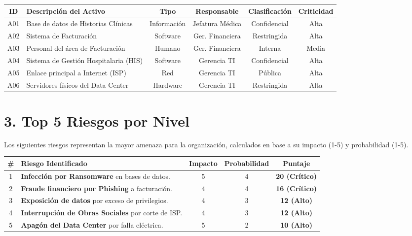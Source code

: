 \documentclass[11pt,a4paper]{article}
\begin{document}
\vspace{0.3cm}
\noindent
\begin{tabularx}{\textwidth}{|c|X|c|c|c|c|}
\hline
\rowcolor{primary} \textbf{\color{white}ID} & \textbf{\color{white}Descripción del Activo} & \textbf{\color{white}Tipo} & \textbf{\color{white}Responsable} & \textbf{\color{white}Clasificación} & \textbf{\color{white}Criticidad} \\ \hline
A01 & Base de datos de Historias Clínicas & Información & Jefatura Médica & Confidencial & Alta \\ \hline
A02 & Sistema de Facturación & Software & Ger. Financiera & Restringida & Alta \\ \hline
A03 & Personal del área de Facturación & Humano & Ger. Financiera & Interna & Media \\ \hline
A04 & Sistema de Gestión Hospitalaria (HIS) & Software & Gerencia TI & Confidencial & Alta \\ \hline
A05 & Enlace principal a Internet (ISP) & Red & Gerencia TI & Pública & Alta \\ \hline
A06 & Servidores físicos del Data Center & Hardware & Gerencia TI & Restringida & Alta \\ \hline
\end{tabularx}

\vspace{0.8cm}

\section*{3. Top 5 Riesgos por Nivel}
Los siguientes riesgos representan la mayor amenaza para la organización, calculados en base a su impacto (1-5) y probabilidad (1-5).

\vspace{0.3cm}
\noindent
\begin{tabularx}{\textwidth}{|c|X|c|c|c|}
\hline
\rowcolor{primary} \textbf{\color{white}\#} & \textbf{\color{white}Riesgo Identificado} & \textbf{\color{white}Impacto} & \textbf{\color{white}Probabilidad} & \textbf{\color{white}Puntaje} \\ \hline
1 & \textbf{Infección por Ransomware} en bases de datos. & 5 & 4 & \cellcolor{critical!30}\textbf{20 (Crítico)} \\ \hline
2 & \textbf{Fraude financiero por Phishing} a facturación. & 4 & 4 & \cellcolor{critical!30}\textbf{16 (Crítico)} \\ \hline
3 & \textbf{Exposición de datos} por exceso de privilegios. & 4 & 3 & \cellcolor{high!30}\textbf{12 (Alto)} \\ \hline
4 & \textbf{Interrupción de Obras Sociales} por corte de ISP. & 4 & 3 & \cellcolor{high!30}\textbf{12 (Alto)} \\ \hline
5 & \textbf{Apagón del Data Center} por falla eléctrica. & 5 & 2 & \cellcolor{high!30}\textbf{10 (Alto)} \\ \hline
\end{tabularx}
\end{document}
